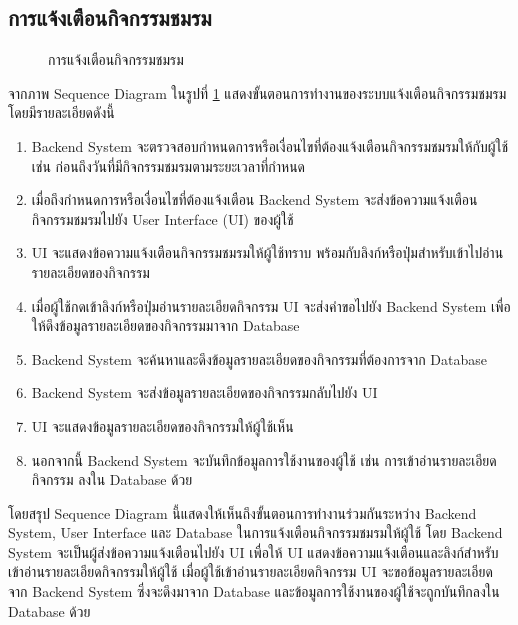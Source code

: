 \documentclass[14pt,oneside,openright,a4paper]{cpe-thai-project}
\begin{document}
\newpage

\subsection{การแจ้งเตือนกิจกรรมชมรม}

  \begin{figure}[!h]\centering
    \setlength{\fboxrule}{0.5mm} %
    \setlength{\fboxsep}{0.5cm}
    \caption{การแจ้งเตือนกิจกรรมชมรม}\label{fig:Notification about event from club}
  \end{figure}

  จากภาพ Sequence Diagram ในรูปที่ \ref{fig:Notification about event from club} แสดงขั้นตอนการทำงานของระบบแจ้งเตือนกิจกรรมชมรม โดยมีรายละเอียดดังนี้
  \begin{enumerate}
    \item Backend System จะตรวจสอบกำหนดการหรือเงื่อนไขที่ต้องแจ้งเตือนกิจกรรมชมรมให้กับผู้ใช้ เช่น ก่อนถึงวันที่มีกิจกรรมชมรมตามระยะเวลาที่กำหนด
    \item เมื่อถึงกำหนดการหรือเงื่อนไขที่ต้องแจ้งเตือน Backend System จะส่งข้อความแจ้งเตือนกิจกรรมชมรมไปยัง User Interface (UI) ของผู้ใช้
    \item UI จะแสดงข้อความแจ้งเตือนกิจกรรมชมรมให้ผู้ใช้ทราบ พร้อมกับลิงก์หรือปุ่มสำหรับเข้าไปอ่านรายละเอียดของกิจกรรม
    \item เมื่อผู้ใช้กดเข้าลิงก์หรือปุ่มอ่านรายละเอียดกิจกรรม UI จะส่งคำขอไปยัง Backend System เพื่อให้ดึงข้อมูลรายละเอียดของกิจกรรมมาจาก Database
    \item Backend System จะค้นหาและดึงข้อมูลรายละเอียดของกิจกรรมที่ต้องการจาก Database
    \item Backend System จะส่งข้อมูลรายละเอียดของกิจกรรมกลับไปยัง UI
    \item UI จะแสดงข้อมูลรายละเอียดของกิจกรรมให้ผู้ใช้เห็น
    \item นอกจากนี้ Backend System จะบันทึกข้อมูลการใช้งานของผู้ใช้ เช่น การเข้าอ่านรายละเอียดกิจกรรม ลงใน Database ด้วย
  \end{enumerate}
  โดยสรุป Sequence Diagram นี้แสดงให้เห็นถึงขั้นตอนการทำงานร่วมกันระหว่าง Backend System, User Interface และ Database ในการแจ้งเตือนกิจกรรมชมรมให้ผู้ใช้ โดย Backend System จะเป็นผู้ส่งข้อความแจ้งเตือนไปยัง UI เพื่อให้ UI แสดงข้อความแจ้งเตือนและลิงก์สำหรับเข้าอ่านรายละเอียดกิจกรรมให้ผู้ใช้ เมื่อผู้ใช้เข้าอ่านรายละเอียดกิจกรรม UI จะขอข้อมูลรายละเอียดจาก Backend System ซึ่งจะดึงมาจาก Database และข้อมูลการใช้งานของผู้ใช้จะถูกบันทึกลงใน Database ด้วย
\end{document}
